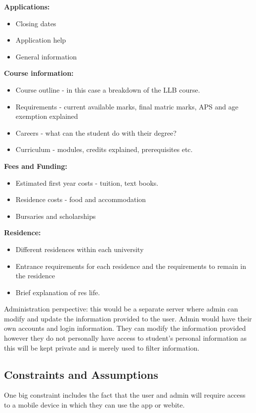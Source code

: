 \documentclass[a4paper, 12pt]{article}
\begin{document}
\textbf{Applications:}
\begin{itemize}
\item Closing dates
\item Application help 
\item General information 
\end{itemize}

\textbf{Course information:}
\begin{itemize}
\item Course outline - in this case a breakdown of the LLB course.
\item Requirements - current available marks, final matric marks, APS and age exemption explained 
\item Careers - what can the student do with their degree?
\item Curriculum - modules, credits explained, prerequisites etc.
\end{itemize}

\textbf{Fees and Funding:}
\begin{itemize}
\item Estimated first year costs - tuition, text books.
\item Residence costs - food and accommodation
\item Bursaries and scholarships  
\end{itemize}

\textbf{Residence:} 
\begin{itemize}
\item Different residences within each university 
\item Entrance requirements for each residence and the requirements to remain in the residence 
\item Brief explanation of res life.
\end{itemize}

Administration perspective: this would be a separate server where admin can modify and update the information provided to the user. Admin would have their own accounts and login information. They can modify the information provided however they do not personally have access to student’s personal information as this will be kept private and is merely used to filter information.


\subsection{Constraints and Assumptions}

One big constraint includes the fact that the user and admin will require access to a mobile device in which they can use the app or webite.
\end{document}
